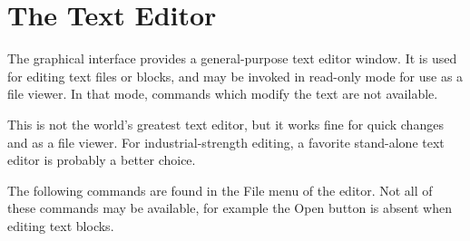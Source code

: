 \section{The Text Editor}
\label{textedit}

The graphical interface provides a general-purpose text editor window. 
It is used for editing text files or blocks, and may be invoked in
read-only mode for use as a file viewer.  In that mode, commands which
modify the text are not available.

This is not the world's greatest text editor, but it
works fine for quick changes and as a file viewer.  For
industrial-strength editing, a favorite stand-alone text editor is
probably a better choice. 

The following commands are found in the {\cb File} menu of the
editor.  Not all of these commands may be available, for example the
{\cb Open} button is absent when editing text blocks.

